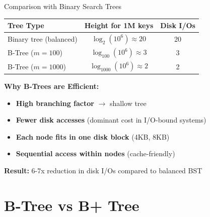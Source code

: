 \documentclass[aspectratio=169]{beamer}
\begin{document}
\begin{frame}{Comparison with Binary Search Trees}
  \begin{center}
  \begin{tabular}{|l|c|c|}
    \hline
    \textbf{Tree Type} & \textbf{Height for 1M keys} & \textbf{Disk I/Os} \\
    \hline
    Binary tree (balanced) & $\log_2(10^6) \approx 20$ & 20 \\
    \hline
    B-Tree ($m=100$) & $\log_{100}(10^6) \approx 3$ & 3 \\
    \hline
    B-Tree ($m=1000$) & $\log_{1000}(10^6) \approx 2$ & 2 \\
    \hline
  \end{tabular}
  \end{center}

  \vspace{0.3cm}
  \textbf{Why B-Trees are Efficient:}
  \begin{itemize}
    \item \textbf{High branching factor} $\rightarrow$ shallow tree
    \item \textbf{Fewer disk accesses} (dominant cost in I/O-bound systems)
    \item \textbf{Each node fits in one disk block} (4KB, 8KB)
    \item \textbf{Sequential access within nodes} (cache-friendly)
  \end{itemize}

  \vspace{0.3cm}
  \textbf{Result:} 6-7x reduction in disk I/Os compared to balanced BST
\end{frame}

\section{B-Tree vs B+ Tree}
\end{document}
